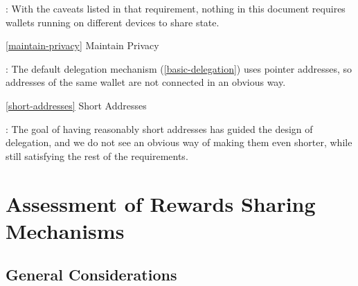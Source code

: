 \documentclass[11pt,a4paper]{article}
\begin{document}
: With the caveats listed in that requirement, nothing in this document
requires wallets running on different devices to share state.

\ref{maintain-privacy} Maintain Privacy

: The default delegation mechanism (\ref{basic-delegation}) uses pointer
addresses, so addresses of the same wallet are not connected in an
obvious way.

\ref{short-addresses} Short Addresses

: The goal of having reasonably short addresses has guided the design of
delegation, and we do not see an obvious way of making them even
shorter, while still satisfying the rest of the requirements.

\appendix

\section{Assessment of Rewards Sharing
Mechanisms}\label{assessment-of-rewards-sharing-mechanisms}

\subsection{General Considerations}\label{general-considerations}
\end{document}
